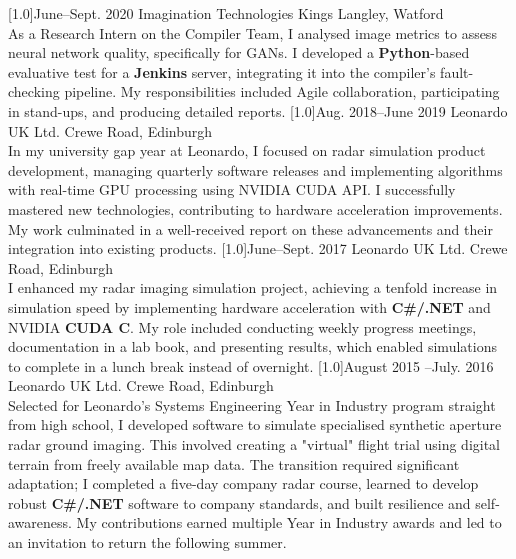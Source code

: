 \documentclass[a4paper]{cv-style}     %
\begin{document}
\begin{entrylist}
{%
}
\entry
  {\scalebox{.8}[1.0]{June--Sept.  2020}}
  {Imagination Technologies}
  {Kings Langley, Watford}
  {\\
As a Research Intern on the Compiler Team, I analysed image metrics to assess neural network quality, specifically for GANs. I developed a \textbf{Python}-based evaluative test for a \textbf{Jenkins} server, integrating it into the compiler's fault-checking pipeline. My responsibilities included Agile collaboration, participating in stand-ups, and producing detailed reports.
 }
\entry
  {\scalebox{.8}[1.0]{Aug. 2018--June 2019}}
  {Leonardo UK Ltd.}
  {Crewe Road, Edinburgh}
  {\\
  In my university gap year at Leonardo, I focused on radar simulation product development, managing quarterly software releases and implementing algorithms with real-time GPU processing using NVIDIA CUDA API. I successfully mastered new technologies, contributing to hardware acceleration improvements. My work culminated in a well-received report on these advancements and their integration into existing products.
}
\entry
  {\scalebox{.8}[1.0]{June--Sept. 2017}}
  {Leonardo UK Ltd.}
  {Crewe Road, Edinburgh}
  {\\
  I enhanced my radar imaging simulation project, achieving a tenfold increase in simulation speed by implementing hardware acceleration with \textbf{C#/.NET} and NVIDIA \textbf{CUDA C}. My role included conducting weekly progress meetings, documentation in a lab book, and presenting results, which enabled simulations to complete in a lunch break instead of overnight.
}
\entry
  {\scalebox{.8}[1.0]{August 2015 --July.  2016}}
  {Leonardo UK Ltd.}
  {Crewe Road, Edinburgh}
  {\\
 Selected for Leonardo's Systems Engineering Year in Industry program straight from high school, I developed software to simulate specialised synthetic aperture radar ground imaging. This involved creating a "virtual" flight trial using digital terrain from freely available map data. The transition required significant adaptation; I completed a five-day company radar course, learned to develop robust \textbf{C#/.NET} software to company standards, and built resilience and self-awareness. My contributions earned multiple Year in Industry awards and led to an invitation to return the following summer.
}


\end{entrylist}
\end{document}
